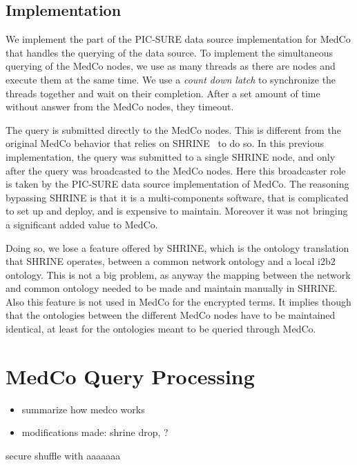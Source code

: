 
\subsection*{Implementation}

We implement the part of the PIC-SURE data source implementation for MedCo that handles the querying of the data source.
To implement the simultaneous querying of the MedCo nodes, we use as many threads as there are nodes and execute them at the same time. 
We use a \emph{count down latch} to synchronize the threads together and wait on their completion.
After a set amount of time without answer from the MedCo nodes, they timeout.

The query is submitted directly to the MedCo nodes. 
This is different from the original MedCo behavior that relies on SHRINE~\cite{todo} to do so.
In this previous implementation, the query was submitted to a single SHRINE node, and only after the query was broadcasted to the MedCo nodes.
Here this broadcaster role is taken by the PIC-SURE data source implementation of MedCo.
The reasoning bypassing SHRINE is that it is a multi-components software, that is complicated to set up and deploy, and is expensive to maintain.
Moreover it was not bringing a significant added value to MedCo.

Doing so, we lose a feature offered by SHRINE, which is the ontology translation that SHRINE operates, between a common network ontology and a local i2b2 ontology.
This is not a big problem, as anyway the mapping between the network and common ontology needed to be made and maintain manually in SHRINE.
Also this feature is not used in MedCo for the encrypted terms.
It implies though that the ontologies between the different MedCo nodes have to be maintained identical, at least for the ontologies meant to be queried through MedCo.

\section{MedCo Query Processing}
\begin{itemize}
    \item summarize how medco works
    \item modifications made: shrine drop, ?
\end{itemize}

secure shuffle with aaaaaaa

